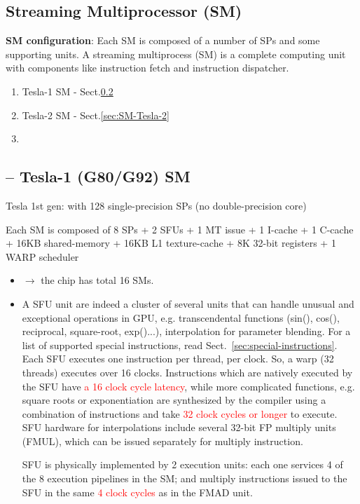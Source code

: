 \subsection{Streaming Multiprocessor (SM)}
\label{sec:stre-mult-sm}

{\bf SM configuration}: Each SM is composed of a number of SPs and some
supporting units. A streaming multiprocess (SM) is a complete computing unit
with components like instruction fetch and instruction dispatcher.

\begin{enumerate}
  \item Tesla-1 SM	 - Sect.\ref{sec:SM-Tesla-1}
  
  \item Tesla-2 SM - Sect.\ref{sec:SM-Tesla-2}
  
  \item 
\end{enumerate}

\subsection{-- Tesla-1 (G80/G92) SM}
\label{sec:SM-Tesla-1}

Tesla 1st gen: with 128 single-precision SPs (no double-precision core)
  
Each SM is composed of 8 SPs + 2 SFUs + 1 MT issue + 1 I-cache + 1 C-cache +
16KB shared-memory + 16KB L1 texture-cache + 8K 32-bit registers + 1 WARP scheduler
    
\begin{itemize}
  \item  $\rightarrow$ the chip has total 16 SMs.

  \item A SFU unit are indeed a cluster of several units that can
    handle unusual and exceptional operations in GPU,
    e.g. transcendental functions (sin(), cos(), reciprocal,
    square-root, exp()...), interpolation for parameter blending. For
    a list of supported special instructions, read
    Sect.~\ref{sec:special-instructions}. Each SFU executes one
    instruction per thread, per clock. So, a warp (32 threads)
    executes over 16 clocks.  Instructions which are natively executed
    by the SFU have \textcolor{red}{a 16 clock cycle latency}, while
    more complicated functions, e.g. square roots or exponentiation
    are synthesized by the compiler using a combination of
    instructions and take \textcolor{red}{32 clock cycles or longer}
    to execute. SFU hardware for interpolations include several 32-bit
    FP multiply units (FMUL), which can be issued separately for
    multiply instruction.

    SFU is physically implemented by 2 execution units: each one
    services 4 of the 8 execution pipelines in the SM; and multiply
    instructions issued to the SFU in the same
    \textcolor{red}{4 clock cycles} as in the FMAD unit.

  \end{itemize}

